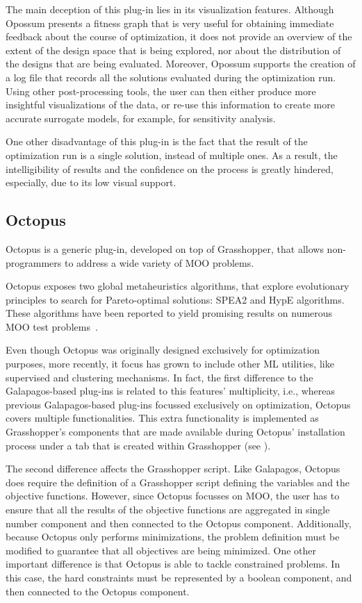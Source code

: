 The main deception of this plug-in lies in its visualization features. Although Opossum presents a fitness graph that is very useful for obtaining immediate feedback about the course of optimization, it does not provide an overview of the extent of the design space that is being explored, nor about the distribution of the designs that are being evaluated. Moreover, Opossum supports the creation of a log file that records all the solutions evaluated during the optimization run. Using other post-processing tools, the user can then either produce more insightful visualizations of the data, or re-use this information to create more accurate surrogate models, for example, for sensitivity analysis.

One other disadvantage of this plug-in is the fact that the result of the optimization run is a single solution, instead of multiple ones. As a result, the intelligibility of results and the confidence on the process is greatly hindered, especially, due to its low visual support. 

\subsection{Octopus}

Octopus is a generic plug-in, developed on top of Grasshopper, that allows non-programmers to address a wide variety of \ac{MOO} problems. 

Octopus exposes two global metaheuristics algorithms, that explore evolutionary principles to search for Pareto-optimal solutions: \ac{SPEA2} and \ac{HypE} algorithms. These algorithms have been reported to yield promising results on numerous \ac{MOO} test problems~\cite{Zitzler2001SPEA2,Zitzler2011HypE}. 

Even though Octopus was originally designed exclusively for optimization purposes, more recently, it focus has grown to include other \ac{ML} utilities, like supervised and clustering mechanisms. In fact, the first difference to the Galapagos-based plug-ins is related to this features' multiplicity, i.e., whereas previous Galapagos-based plug-ins focussed exclusively on optimization, Octopus covers multiple functionalities. This extra functionality is implemented as Grasshopper's components that are made available during Octopus' installation process under a tab that is created within Grasshopper (see ).

The second difference affects the Grasshopper script. Like Galapagos, Octopus does require the definition of a Grasshopper script defining the variables and the objective functions. However, since Octopus focusses on \ac{MOO}, the user has to ensure that all the results of the objective functions are aggregated in single number component and then connected to the Octopus component. Additionally, because Octopus only performs minimizations, the problem definition must be modified to guarantee that all objectives are being minimized. One other important difference is that Octopus is able to tackle constrained problems. In this case, the hard constraints must be represented by a boolean component, and then connected to the Octopus component.

